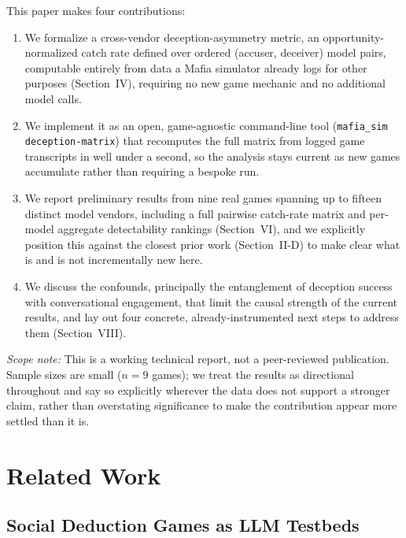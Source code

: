 \documentclass[10pt,conference]{IEEEtran}
\begin{document}
This paper makes four contributions:
\begin{enumerate}[leftmargin=*]
\item We formalize a cross-vendor deception-asymmetry metric, an opportunity-normalized catch rate defined over ordered (accuser, deceiver) model pairs, computable entirely from data a Mafia simulator already logs for other purposes (Section~IV), requiring no new game mechanic and no additional model calls.
\item We implement it as an open, game-agnostic command-line tool (\texttt{mafia\_sim deception-matrix}) that recomputes the full matrix from logged game transcripts in well under a second, so the analysis stays current as new games accumulate rather than requiring a bespoke run.
\item We report preliminary results from nine real games spanning up to fifteen distinct model vendors, including a full pairwise catch-rate matrix and per-model aggregate detectability rankings (Section~VI), and we explicitly position this against the closest prior work (Section~II-D) to make clear what is and is not incrementally new here.
\item We discuss the confounds, principally the entanglement of deception success with conversational engagement, that limit the causal strength of the current results, and lay out four concrete, already-instrumented next steps to address them (Section~VIII).
\end{enumerate}

\textit{Scope note:} This is a working technical report, not a peer-reviewed publication. Sample sizes are small ($n=9$ games); we treat the results as directional throughout and say so explicitly wherever the data does not support a stronger claim, rather than overstating significance to make the contribution appear more settled than it is.

\section{Related Work}

\subsection{Social Deduction Games as LLM Testbeds}
\end{document}
